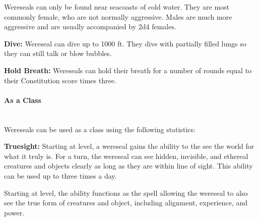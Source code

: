 \begin{multicols*}{2}
Wereseals can only be found near seacoasts of cold water. They are most commonly female, who are not normally aggressive. Males are much more aggressive and are usually accompanied by 2d4 females.

\textbf{Dive:} Wereseal can dive up to 1000 ft. They dive with partially filled lungs so they can still talk or blow bubbles.

\textbf{Hold Breath:} Wereseals can hold their breath for a number of rounds equal to their Constitution score times three.

\paragraph{As a Class}\mbox{}\\
Wereseals can be used as a class using the following statistics:

\textbf{Truesight:} Starting at  level, a wereseal gains the ability to the see the world for what it truly is. For a turn, the wereseal can see hidden, invisible, and ethereal creatures and objects clearly as long as they are within line of sight. This ability can be used up to three times a day.

Starting at  level, the ability functions as the spell  allowing the wereseal to also see the true form of creatures and object, including alignment, experience, and power.



\end{multicols*}
